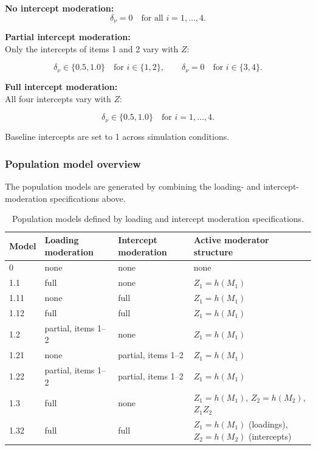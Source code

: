 \documentclass[
  man,
  floatsintext]{apa7}
\begin{document}
\textbf{No intercept moderation:}\\
\[
\delta_{\nu}=0 \quad \text{for all } i=1,\dots,4.
\]

\textbf{Partial intercept moderation:}\\
Only the intercepts of items 1 and 2 vary with \(Z\):

\[
\delta_{\nu} \in \{0.5,1.0\}
\quad \text{for } i \in \{1,2\},
\qquad
\delta_{\nu}=0
\quad \text{for } i \in \{3,4\}.
\]

\textbf{Full intercept moderation:}\\
All four intercepts vary with \(Z\):

\[
\delta_{\nu} \in \{0.5,1.0\}
\quad \text{for } i=1,\dots,4.
\]

Baseline intercepts are set to 1 across simulation conditions.

\newpage

\subsubsection{Population model
overview}\label{population-model-overview}

The population models are generated by combining the loading- and
intercept-moderation specifications above.

\begin{table}[!htbp]
\centering
\caption{Population models defined by loading and intercept moderation specifications.}
\label{tab:population-models}
\begin{tabular}{llll}
\toprule
Model & Loading moderation & Intercept moderation & Active moderator structure \\
\midrule
0    & none & none & none \\
1.1  & full & none & $Z_1 = h(M_1)$ \\
1.11 & none & full & $Z_1 = h(M_1)$ \\
1.12 & full & full & $Z_1 = h(M_1)$ \\
1.2  & partial, items 1--2 & none & $Z_1 = h(M_1)$ \\
1.21 & none & partial, items 1--2 & $Z_1 = h(M_1)$ \\
1.22 & partial, items 1--2 & partial, items 1--2 & $Z_1 = h(M_1)$ \\
1.3  & full & none & $Z_1 = h(M_1)$, $Z_2 = h(M_2)$, $Z_1Z_2$ \\
1.32 & full & full & $Z_1 = h(M_1)$ (loadings), $Z_2 = h(M_2)$ (intercepts) \\
\bottomrule
\end{tabular}
\end{table}
\end{document}
